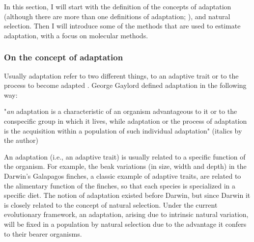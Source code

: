 
In this section, I will start with the definition of the concepts of adaptation (although there are more than one definitions of adaptation; \citealp{endler1986natural}), and natural selection. Then I will introduce some of the methods that are used to estimate adaptation, with a focus on molecular methods.

\subsubsection{On the concept of adaptation}
Usually adaptation refer to two different things, to an adaptive trait or to the process to become adapted \citep{endler1986natural}.
George Gaylord \citet{Simpson1953} defined adaptation in the following way: 

"\textit{an} adaptation is a characteristic of an organism advantageous to it or to the conspecific group in which it lives, while adaptation or the process of adaptation is the acquisition within a population of such individual adaptation" (italics by the author)

An adaptation (i.e., an adaptive trait) is usually related to a specific function of the organism. For example, the beak variations (in size, width and depth) in the Darwin's Galapagos finches, a classic example of adaptive traits, are related to the alimentary function of the finches, so that each species is specialized in a specific diet.
The notion of adaptation existed before Darwin, but since Darwin it is closely related to the concept of natural selection. Under the current evolutionary framework, an adaptation, arising due to intrinsic natural variation, will be fixed in a population by natural selection due to the advantage it confers to their bearer organisms.

%
%


